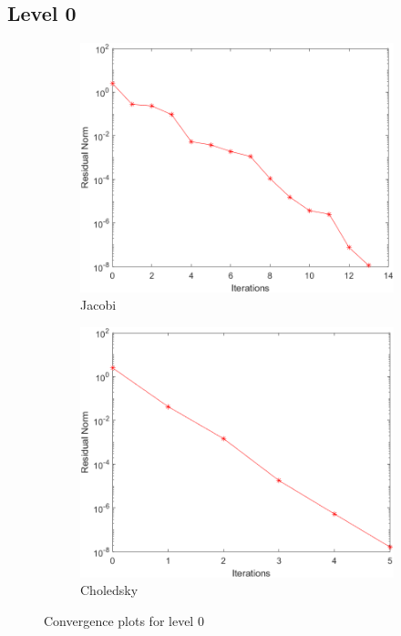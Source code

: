 \documentclass[a4paper, 11pt]{article}
\begin{document}
			\subsection*{Level 0}
				\begin{figure}[H]
					\begin{subfigure}{.49\textwidth}
						\centering
						\includegraphics[width=.99\linewidth]{img0/J.png}  
						\caption{Jacobi}
						\label{fig:Jacobi_0}
					\end{subfigure}
					\begin{subfigure}{.49\textwidth}
						\centering
						\includegraphics[width=.99\linewidth]{img0/C.png}  
						\caption{Choledsky}
						\label{fig:Chol_0}
					\end{subfigure}
					\caption{Convergence plots for level 0}
					\label{fig:fig0}
				\end{figure}
				
\end{document}
